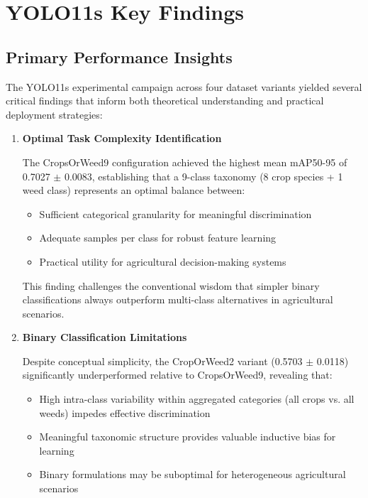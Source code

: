 \section{YOLO11s Key Findings}

\subsection{Primary Performance Insights}

The YOLO11s experimental campaign across four dataset variants yielded several critical findings that inform both theoretical understanding and practical deployment strategies:

\begin{enumerate}
    \item \textbf{Optimal Task Complexity Identification}
    
    The CropsOrWeed9 configuration achieved the highest mean mAP50-95 of 0.7027 $\pm$ 0.0083, establishing that a 9-class taxonomy (8 crop species + 1 weed class) represents an optimal balance between:
    \begin{itemize}
        \item Sufficient categorical granularity for meaningful discrimination
        \item Adequate samples per class for robust feature learning
        \item Practical utility for agricultural decision-making systems
    \end{itemize}
    
    This finding challenges the conventional wisdom that simpler binary classifications always outperform multi-class alternatives in agricultural scenarios.
    
    \item \textbf{Binary Classification Limitations}
    
    Despite conceptual simplicity, the CropOrWeed2 variant (0.5703 $\pm$ 0.0118) significantly underperformed relative to CropsOrWeed9, revealing that:
    \begin{itemize}
        \item High intra-class variability within aggregated categories (all crops vs. all weeds) impedes effective discrimination
        \item Meaningful taxonomic structure provides valuable inductive bias for learning
        \item Binary formulations may be suboptimal for heterogeneous agricultural scenarios
    \end{itemize}
    

\end{enumerate}
